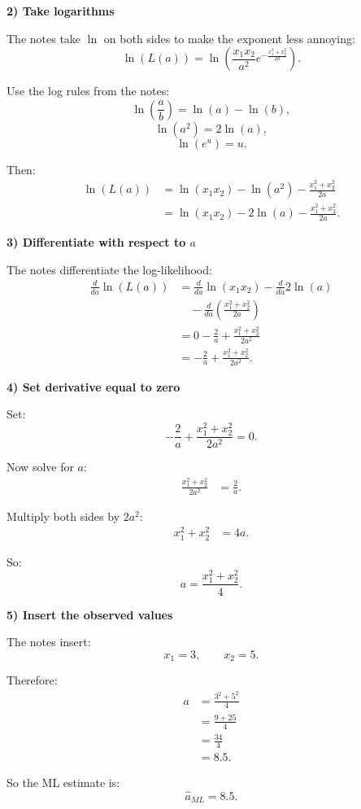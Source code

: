 \documentclass[10pt]{article}
\begin{document}
\textbf{2) Take logarithms}

The notes take \(\ln\) on both sides to make the
exponent less annoying:
\[
\ln(L(a))
=
\ln\left(
\frac{x_1x_2}{a^2}
e^{
-\frac{x_1^2+x_2^2}{2a}
}
\right).
\]

Use the log rules from the notes:
\[
\ln\left(\frac{a}{b}\right)
=
\ln(a)-\ln(b),
\]
\[
\ln(a^2)=2\ln(a),
\]
\[
\ln(e^u)=u.
\]

Then:
\begin{align*}
\ln(L(a))
&=
\ln(x_1x_2)
-
\ln(a^2)
-
\frac{x_1^2+x_2^2}{2a}
\\[2mm]
&=
\ln(x_1x_2)
-
2\ln(a)
-
\frac{x_1^2+x_2^2}{2a}.
\end{align*}

\textbf{3) Differentiate with respect to \(a\)}

The notes differentiate the log-likelihood:
\begin{align*}
\frac{d}{da}\ln(L(a))
&=
\frac{d}{da}\ln(x_1x_2)
-
\frac{d}{da}2\ln(a)
\\
&\quad
-
\frac{d}{da}
\left(
\frac{x_1^2+x_2^2}{2a}
\right)
\\[2mm]
&=
0
-
\frac{2}{a}
+
\frac{x_1^2+x_2^2}{2a^2}
\\[2mm]
&=
-\frac{2}{a}
+
\frac{x_1^2+x_2^2}{2a^2}.
\end{align*}

\textbf{4) Set derivative equal to zero}

Set:
\[
-\frac{2}{a}
+
\frac{x_1^2+x_2^2}{2a^2}
=0.
\]

Now solve for \(a\):
\begin{align*}
\frac{x_1^2+x_2^2}{2a^2}
&=
\frac{2}{a}.
\end{align*}

Multiply both sides by \(2a^2\):
\begin{align*}
x_1^2+x_2^2
&=
4a.
\end{align*}

So:
\[
a
=
\frac{x_1^2+x_2^2}{4}.
\]

\textbf{5) Insert the observed values}

The notes insert:
\[
x_1=3,
\qquad
x_2=5.
\]

Therefore:
\begin{align*}
a
&=
\frac{3^2+5^2}{4}
\\[2mm]
&=
\frac{9+25}{4}
\\[2mm]
&=
\frac{34}{4}
\\[2mm]
&=
8.5.
\end{align*}

So the ML estimate is:
\[
\hat{a}_{ML}=8.5.
\]
\end{document}
